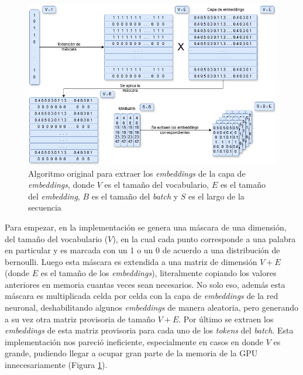 \begin{figure}[htb]
    \centering
    \includegraphics[width=1\textwidth]{imagenes/algoritmo_viejo.png}
    \caption{Algoritmo original para extraer los \textit{embeddings} de la capa de \textit{embeddings}, donde $V$ es el tamaño del vocabulario, $E$ es el tamaño del \textit{embedding}, $B$ es el tamaño del \textit{batch} y $S$ es el largo de la secuencia}
    \label{fig:algoritmo_viejo}
\end{figure}

Para empezar, en la implementación se genera una máscara de una dimensión, del tamaño del vocabulario ($V$), en la cual cada punto corresponde a una palabra en particular y es marcada con un 1 o un 0 de acuerdo a una distribución de bernoulli. Luego esta máscara es extendida a una matriz de dimensión $V + E$ (donde $E$ es el tamaño de los \textit{embeddings}), literalmente copiando los valores anteriores en memoria cuantas veces sean necesarios. No solo eso, además esta máscara es multiplicada celda por celda con la capa de \textit{embeddings} de la red neuronal, deshabilitando algunos \textit{embeddings} de manera aleatoria, pero generando a su vez otra matriz provisoria de tamaño $V + E$. Por último se extraen los \textit{embeddings} de esta matriz provisoria para cada uno de los \textit{tokens} del \textit{batch}. Esta implementación nos pareció ineficiente, especialmente en casos en donde $V$ es grande, pudiendo llegar a ocupar gran parte de la memoria de la GPU innecesariamente (Figura \ref{fig:algoritmo_viejo}).

